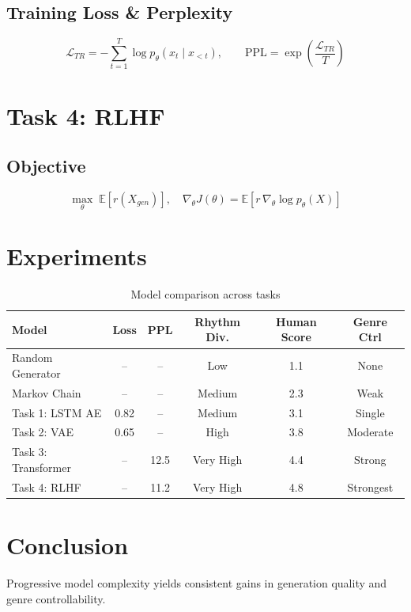 \documentclass{article}
\begin{document}
\subsection{Training Loss \& Perplexity}
\begin{equation}
\mathcal{L}_{TR} = -\sum_{t=1}^{T}\log p_\theta(x_t \mid x_{<t}), \qquad
\text{PPL} = \exp\!\left(\frac{\mathcal{L}_{TR}}{T}\right)
\end{equation}

\section{Task 4: RLHF}
\subsection{Objective}
\begin{equation}
\max_\theta\; \mathbb{E}[r(X_{gen})], \quad
\nabla_\theta J(\theta) = \mathbb{E}\!\left[r\,\nabla_\theta \log p_\theta(X)\right]
\end{equation}

\section{Experiments}
\begin{table}[h]
\centering
\caption{Model comparison across tasks}
\begin{tabular}{lccccc}
\toprule
Model & Loss & PPL & Rhythm Div. & Human Score & Genre Ctrl \\
\midrule
Random Generator & -- & -- & Low & 1.1 & None \\
Markov Chain & -- & -- & Medium & 2.3 & Weak \\
Task 1: LSTM AE & 0.82 & -- & Medium & 3.1 & Single \\
Task 2: VAE & 0.65 & -- & High & 3.8 & Moderate \\
Task 3: Transformer & -- & 12.5 & Very High & 4.4 & Strong \\
Task 4: RLHF & -- & 11.2 & Very High & 4.8 & Strongest \\
\bottomrule
\end{tabular}
\end{table}

\section{Conclusion}
Progressive model complexity yields consistent gains in generation quality and genre controllability.



\end{document}
